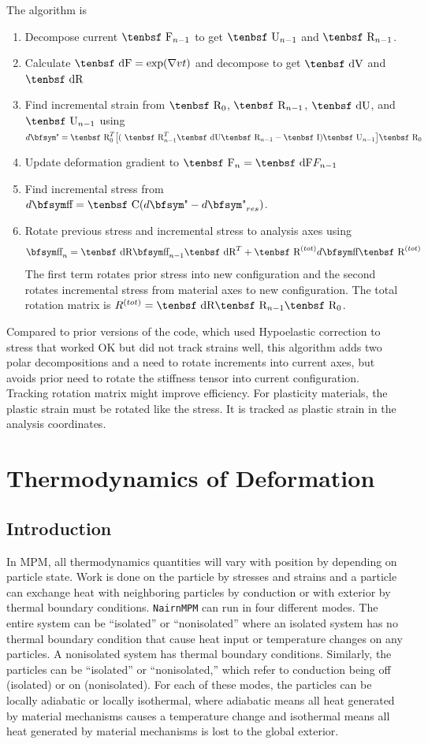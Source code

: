 \documentclass[11pt]{book}
\def\C{\hbox{\tenbsf C}}
\def\F{\hbox{\tenbsf F}}
\def\dF{\hbox{\tenbsf dF}}
\def\I{\hbox{\tenbsf I}}
\def\R{\hbox{\tenbsf R}}
\def\dR{\hbox{\tenbsf dR}}
\def\dV{\hbox{\tenbsf dV}}
\def\U{\hbox{\tenbsf U}}
\def\dU{\hbox{\tenbsf dU}}
\def\st{{\hbox{\bfsym\char'033}}}
\def\et{{\hbox{\bfsym\char'042}}}
\begin{document}
The algorithm is
\begin{enumerate}
\item Decompose current $\F_{n-1}$ to get $\U_{n-1}$ and $\R_{n-1}$.
\item Calculate $\dF = \exp(\nabla v t)$ and decompose to get $\dV$ and $\dR$
\item Find incremental strain from $\R_0$, $\R_{n-1}$, $\dU$, and $\U_{n-1}$ using $d\et=\R_0^T\bigl[(\ \R_{n-1}^T \dU \R_{n-1} - \I)\U_{n-1}\bigr]\R_0$
\item Update deformation gradient to $\F_n = \dF F_{n-1}$
\item Find incremental stress from $d\st =  \C(d\et - d\et_{res})$.
\item Rotate previous stress and incremental stress to analysis axes using
\begin{equation}
   \st_n = \dR \st_{n-1}\dR^T + \R^{(tot)}d\st\R^{(tot)}
\end{equation}
The first term rotates prior stress into new configuration and the second rotates incremental stress from material axes to new configuration. The total rotation matrix is $R^{(tot)} = \dR \R_{n-1}\R_0$.
\end{enumerate}
Compared to prior versions of the code, which used Hypoelastic correction to stress that worked OK but did not track strains well, this algorithm adds two polar decompositions and a need to rotate increments into current axes, but avoids prior need to rotate the stiffness tensor into current configuration. Tracking rotation matrix might improve efficiency. For plasticity materials, the plastic strain must be rotated like the stress. It is tracked as plastic strain in the analysis coordinates.


\chapter{Thermodynamics of Deformation}

\section{Introduction}


In MPM, all thermodynamics quantities will vary with position by depending on particle state. Work is done on the particle by stresses and strains and a particle can exchange heat with neighboring particles by conduction or with exterior by thermal boundary conditions. {\tt NairnMPM} can run in four different modes. The entire system can be ``isolated'' or ``nonisolated'' where an isolated system has no thermal boundary condition that cause heat input or temperature changes on any particles. A nonisolated system has thermal boundary conditions. Similarly, the particles can be ``isolated'' or ``nonisolated,'' which refer to conduction being off (isolated) or on (nonisolated). For each of these modes, the particles can be locally adiabatic or locally isothermal, where adiabatic means all heat generated by material mechanisms causes a temperature change and isothermal means all heat generated by material mechanisms is lost to the global exterior.
\end{document}
